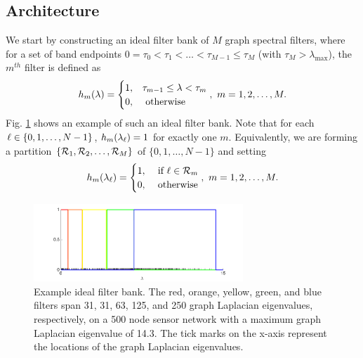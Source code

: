 \documentclass[journal, 10pt]{IEEEtran}
\begin{document}
\subsection{Architecture}
We start by constructing an ideal filter bank of $M$ graph spectral filters, where for a set of band endpoints $0=\tau_0 < \tau_1 < \ldots < \tau_{M-1} \leq \tau_M$ (with $\tau_M > \lambda_{\max}$), the $m^{th}$ filter is defined as
\begin{align} \label{Eq:bandpass}
{h}_m(\lambda)=
\begin{cases}
1,& \tau_{m-1} \leq \lambda < \tau_m  \\
0,&\hbox{ otherwise}
\end{cases},~m=1,2,\ldots,M.
\end{align}
 Fig. \ref{Fig:fb} shows an example of such an ideal filter bank. Note that for each $\ell \in \{0,1,\ldots,N-1\}$, ${h}_m(\lambda_\ell)=1$ for exactly one $m$. 
Equivalently, we are forming a partition $\{{\cal R}_1,{\cal R}_2,\ldots,{\cal R}_M\}$ of $\{0,1,\ldots,N-1\}$ and setting
\begin{align*}
{h}_m(\lambda_{\l})=
\begin{cases}
1,&\hbox{ if } {\l} \in {\cal R}_m \\
0,&\hbox{ otherwise}
\end{cases},~m=1,2,\ldots,M.
\end{align*}

\begin{figure}[t]
\centerline{\includegraphics[width=3.1in]{fig_filter_bank}}
\caption{Example ideal filter bank. The red, orange, yellow, green, and blue filters span 31, 31, 63, 125, and 250 graph Laplacian eigenvalues, respectively, on a 500 node sensor network with %
a maximum graph Laplacian eigenvalue of 14.3. The tick marks on the x-axis represent the locations of the graph Laplacian eigenvalues.}\label{Fig:fb}
\end{figure}
\end{document}
